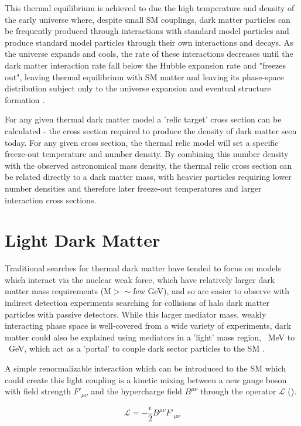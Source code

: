 This thermal equilibrium is achieved to due the high temperature and density of the early universe where, despite small SM couplings, dark matter particles can be frequently produced through interactions with standard model particles and produce standard model particles through their own interactions and decays.
As the universe expands and cools, the rate of these interactions decreases until the dark matter interaction rate fall below the Hubble expansion rate and "freezes out", leaving thermal equilibrium with SM matter and leaving its phase-space distribution subject only to the universe expansion and eventual structure formation \cite{thermalDM}.

For any given thermal dark matter model a 'relic target' cross section can be calculated - the cross section required to produce the density of dark matter seen today.
For any given cross section, the thermal relic model will set a specific freeze-out temperature and number density.
By combining this number density with the observed astronomical mass density, the thermal relic cross section can be related directly to a dark matter mass, with heavier particles requiring lower number densities and therefore later freeze-out temperatures and larger interaction cross sections.

\section{Light Dark Matter}
Traditional searches for thermal dark matter have tended to focus on models which interact via the nuclear weak force, which have relatively larger dark matter mass requirements (M$>\sim$few GeV), and so are easier to observe with indirect detection experiments searching for collisions of halo dark matter particles with passive detectors.
While this larger mediator mass, weakly interacting phase space is well-covered from a wide variety of experiments, dark matter could also be explained using mediators in a 'light' mass region, ~MeV to ~GeV, which act as a 'portal' to couple dark sector particles to the SM \cite{darkSectors}.

A simple renormalizable interaction which can be introduced to the SM which could create this light coupling is a kinetic mixing between a new gauge boson with field strength $F'_{\mu\nu}$ and the hypercharge field $B^{\mu\nu}$ through the operator $\mathcal{L}$ (). 

\begin{equation}
	\label{eq:LDMlagrangian}
	\mathcal{L} = - \frac{\epsilon}{2} B^{\mu\nu}F'_{\mu\nu}
\end{equation}

